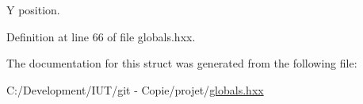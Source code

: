 Y position. 



Definition at line 66 of file globals.\-hxx.



The documentation for this struct was generated from the following file\-:\begin{DoxyCompactItemize}
\item 
C\-:/\-Development/\-I\-U\-T/git -\/ Copie/projet/\hyperlink{globals_8hxx}{globals.\-hxx}\end{DoxyCompactItemize}
